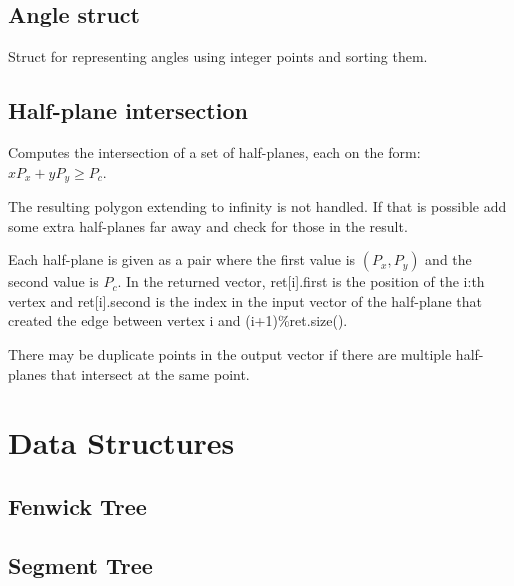 \documentclass{article}
\begin{document}
\subsection*{Angle struct}
Struct for representing angles using integer points and sorting them.


\subsection*{Half-plane intersection}
Computes the intersection of a set of half-planes, each on the form: $x P_x + y P_y \ge P_c$.

The resulting polygon extending to infinity is not handled. If that is possible add some extra half-planes far away and check for those in the result.

Each half-plane is given as a pair where the first value is $(P_x, P_y)$ and the second value is $P_c$.
In the returned vector, ret[i].first is the position of the i:th vertex and ret[i].second is the index in the input vector of the half-plane that created the edge between vertex i and (i+1)\%ret.size().

There may be duplicate points in the output vector if there are multiple half-planes that intersect at the same point.



\pagebreak

\section*{Data Structures}

\subsection*{Fenwick Tree}


\subsection*{Segment Tree}
\begin{multicols}{2}
  
  \columnbreak
  
\end{multicols}

\vspace*{-2.0cm}
\end{document}
